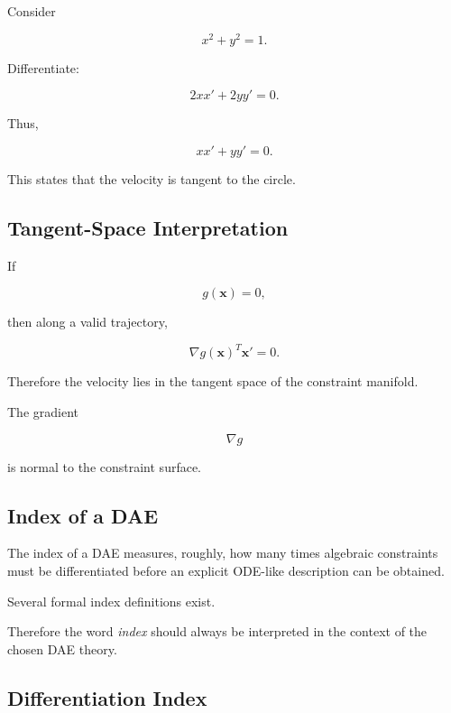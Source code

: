 Consider

\[
\boxed{
x^2+y^2=1.
}
\]

Differentiate:

\[
2xx'
+
2yy'
=
0.
\]

Thus,

\[
\boxed{
xx'+yy'=0.
}
\]

This states that the velocity is tangent to the circle.

\subsection{Tangent-Space Interpretation}
\label{subsec:dae-tangent-space}

If

\[
g(\mathbf{x})=0,
\]

then along a valid trajectory,

\[
\boxed{
\nabla g(\mathbf{x})^T
\mathbf{x}'
=
0.
}
\]

Therefore the velocity lies in the tangent space of the constraint
manifold.

The gradient

\[
\nabla g
\]

is normal to the constraint surface.

\subsection{Index of a DAE}
\label{subsec:dae-index}

The index of a DAE measures, roughly, how many times algebraic constraints
must be differentiated before an explicit ODE-like description can be
obtained.

Several formal index definitions exist.

Therefore the word \emph{index} should always be interpreted in the
context of the chosen DAE theory.

\subsection{Differentiation Index}
\label{subsec:differentiation-index}

